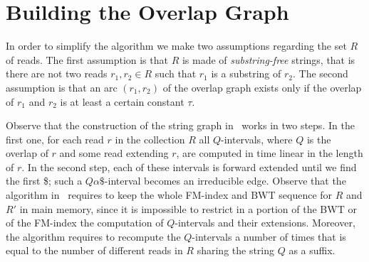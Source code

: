 \documentclass[runningheads,envcountsame,a4paper]{llncs}
\newcommand{\notaestesa}[2]{%
 \marginpar{\color{red!75!black}\textbf{\texttimes}}%
 {\color{red!75!black}%
 [\,\textbullet\,\textsf{\textbf{#1:}} %
 \textsf{\footnotesize#2}\,\textbullet\,]}%
}
\newcommand{\MP}[1]{\notaestesa{MP}{#1}}
\begin{document}
\section{Building the Overlap Graph}







In order to simplify the algorithm we make two assumptions regarding the set $R$
of reads.
The first assumption is that $R$ is made of \emph{substring-free} strings, that is there are not two reads $r_{1}, r_{2}\in R$ such that
$r_{1}$  is a substring of  $r_{2}$.
The second assumption is that an arc $(r_{1}, r_{2})$ of the overlap graph exists only if the overlap of $r_{1}$ and $r_{2}$ is at least a certain constant $\tau$.



Observe that the construction of the string graph in~\cite{Simpson2010} works in two
steps.
In the first one, for each read $r$ in the collection $R$ all
$Q$-intervals, where $Q$ is the overlap of $r$ and some read extending $r$,
are computed in time linear in
the  length of $r$.
In the second step, each of these intervals is forward extended until
we find the first \$; such a $Q\alpha\$$-interval becomes an
irreducible edge.
Observe that the algorithm  in~\cite{Simpson2010} requires to keep the whole FM-index
and BWT sequence for $R$ and $R'$ in main memory, since it is impossible to
restrict   in a portion of the BWT or of the FM-index the computation of $Q$-intervals
and their extensions.
Moreover, the algorithm requires to recompute the $Q$-intervals a number of
times that is equal to the number of different reads in $R$ sharing  the
string $Q$ as a suffix.
\end{document}
